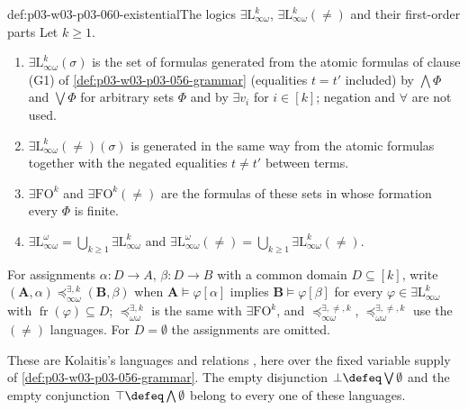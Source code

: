 \begin{hbdefinition}{def:p03-w03-p03-060-existential}{The logics \(\exists\mathrm{L}^k_{\infty\omega}\), \(\exists\mathrm{L}^k_{\infty\omega}(\neq)\) and their first-order parts}
Let \(k\ge1\).
\begin{enumerate}
\item \(\exists\mathrm{L}^k_{\infty\omega}(\sigma)\) is the set of formulas
      generated from the atomic formulas of clause (G1) of
      \cref{def:p03-w03-p03-056-grammar} (equalities \(t=t'\) included) by
      \(\bigwedge\Phi\) and \(\bigvee\Phi\) for arbitrary sets \(\Phi\) and
      by \(\exists v_i\) for \(i\in[k]\); negation and \(\forall\) are not
      used.
\item \(\exists\mathrm{L}^k_{\infty\omega}(\neq)(\sigma)\) is generated in
      the same way from the atomic formulas together with the negated
      equalities \(t\neq t'\) between terms.
\item \(\exists\mathrm{FO}^k\) and \(\exists\mathrm{FO}^k(\neq)\) are the
      formulas of these sets in whose formation every \(\Phi\) is finite.
\item \(\exists\mathrm{L}^\omega_{\infty\omega}=\bigcup_{k\ge1}\exists\mathrm{L}^k_{\infty\omega}\)
      and
      \(\exists\mathrm{L}^\omega_{\infty\omega}(\neq)=\bigcup_{k\ge1}\exists\mathrm{L}^k_{\infty\omega}(\neq)\).
\end{enumerate}
For assignments \(\alpha\colon D\to A\), \(\beta\colon D\to B\) with a
common domain \(D\subseteq[k]\), write
\((\mathbf A,\alpha)\preceq^{\exists,k}_{\infty\omega}(\mathbf B,\beta)\)
when \(\mathbf A\models\varphi[\alpha]\) implies
\(\mathbf B\models\varphi[\beta]\) for every
\(\varphi\in\exists\mathrm{L}^k_{\infty\omega}\) with
\(\operatorname{fr}(\varphi)\subseteq D\);
\(\preceq^{\exists,k}_{\omega\omega}\) is the same with
\(\exists\mathrm{FO}^k\), and \(\preceq^{\exists,\neq,k}_{\infty\omega}\),
\(\preceq^{\exists,\neq,k}_{\omega\omega}\) use the \((\neq)\) languages. For
\(D=\emptyset\) the assignments are omitted.

These are Kolaitis's languages and relations \cite[Def.~8.1, p.~69 and
Def.~8.6, pp.~72--73]{Kolaitis2003ExpressivePowerNotes}, here over the
fixed variable supply of \cref{def:p03-w03-p03-056-grammar}. The empty
disjunction \(\bot\defeq\bigvee\emptyset\) and the empty conjunction
\(\top\defeq\bigwedge\emptyset\) belong to every one of these languages.
\end{hbdefinition}

